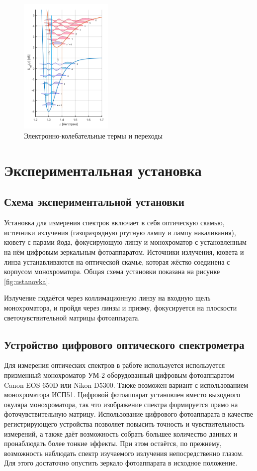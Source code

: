 \documentclass[11.5pt,a4paper,russian]{article}
\begin{document}
\begin{figure}
  \centering
  \includegraphics[width=0.4\textwidth, height=0.4\textwidth]{467e288a-4953-41fa-b857-148b8fde2aa7}
  \caption{Электронно-колебательные термы и переходы}
  \label{fig:frank_condon}
  \vspace{-1cm}
\end{figure}

\section{ Экспериментальная установка}
\subsection{Схема экспериментальной установки}
Установка для измерения спектров включает в себя оптическую скамью, источники излучения (газоразрядную ртутную лампу и лампу накаливания), кювету с парами йода, фокусирующую линзу и монохроматор с установленным на нём цифровым зеркальным фотоаппаратом. Источники излучения, кювета и линза устанавливаются на оптической скамье, которая жёстко соединена с корпусом монохроматора. Общая схема установки показана на рисунке \ref{fig:ustanovka}.

Излучение подаётся через коллимационную линзу на входную щель монохроматора, и пройдя через линзы и призму, фокусируется на плоскости светочувствительной матрицы фотоаппарата.

\subsection{Устройство цифрового оптического спектрометра}
Для измерения оптических спектров в работе используется используется призменный монохроматор УМ-2 оборудованный цифровым фотоаппаратом Canon EOS 650D или Nikon D5300. Также возможен вариант с использованием монохроматора ИСП51. Цифровой фотоаппарат установлен вместо выходного окуляра монохроматора, так что изображение спектра формируется прямо на фоточувствительную матрицу. Использование цифрового фотоаппарата в качестве регистрирующего устройства позволяет повысить точность и чувствительность измерений, а также даёт возможность собрать большее количество данных и пронаблюдать более тонкие эффекты. При этом остаётся, по прежнему, возможность наблюдать спектр изучаемого излучения непосредственно глазом. Для этого достаточно опустить зеркало фотоаппарата в исходное положение.
\end{document}
